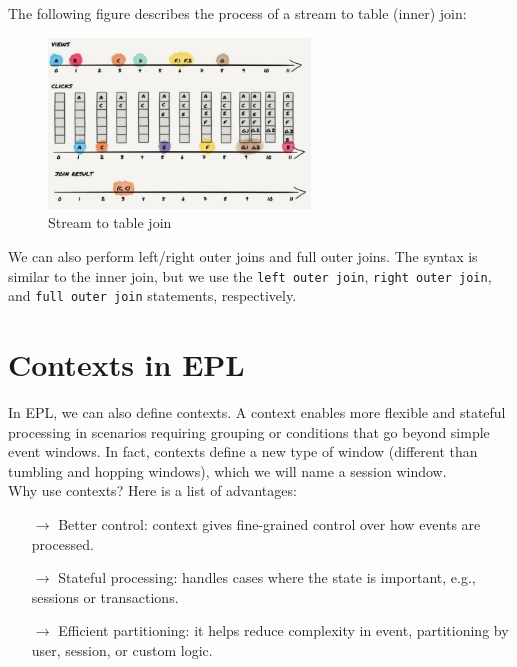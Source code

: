 The following figure describes the process of a stream to table (inner) join:

\begin{figure}[H]
    \centering
    \includegraphics[width=0.62\textwidth]{figures/image_stream_table_join.png}
    \caption{Stream to table join}
    \label{fig:stream_table_join}
\end{figure}

We can also perform left/right outer joins and full outer joins. The syntax is similar to
the inner join, but we use the \texttt{left outer join}, \texttt{right outer join}, and
\texttt{full outer join} statements, respectively.

\section{Contexts in EPL}

In EPL, we can also define contexts. A context enables more flexible and stateful processing
in scenarios requiring grouping or conditions that go beyond simple event windows. In fact, 
contexts define a new type of window (different than tumbling and hopping windows), which we 
will name a session window.\\

Why use contexts? Here is a list of advantages:

\begin{itemize}
    \item[$\rightarrow$] Better control: context gives fine-grained control over how events are processed.

    \item[$\rightarrow$] Stateful processing: handles cases where the state is important, e.g., sessions or
    transactions.

    \item[$\rightarrow$] Efficient partitioning: it helps reduce complexity in event, partitioning by user, 
    session, or custom logic.
\end{itemize}

